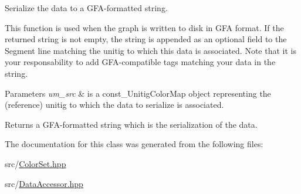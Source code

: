 Serialize the data to a G\+F\+A-\/formatted string. 

This function is used when the graph is written to disk in G\+FA format. If the returned string is not empty, the string is appended as an optional field to the Segment line matching the unitig to which this data is associated. Note that it is your responsability to add G\+F\+A-\/compatible tags matching your data in the string. 
\begin{DoxyParams}{Parameters}
{\em um\+\_\+src} & is a const\+\_\+\+Unitig\+Color\+Map object representing the (reference) unitig to which the data to serialize is associated. \\
\hline
\end{DoxyParams}
\begin{DoxyReturn}{Returns}
a G\+F\+A-\/formatted string which is the serialization of the data. 
\end{DoxyReturn}


The documentation for this class was generated from the following files\+:\begin{DoxyCompactItemize}
\item 
src/\hyperlink{ColorSet_8hpp}{Color\+Set.\+hpp}\item 
src/\hyperlink{DataAccessor_8hpp}{Data\+Accessor.\+hpp}\end{DoxyCompactItemize}
